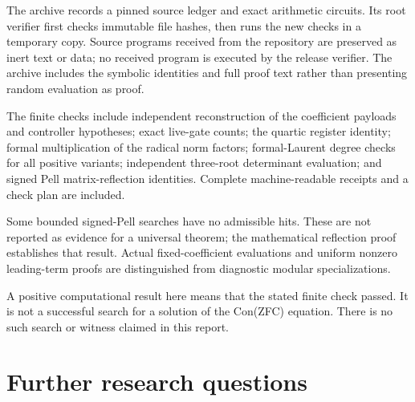 \documentclass[
  10pt,
]{article}
\begin{document}
The archive records a pinned source ledger and exact arithmetic
circuits. Its root verifier first checks immutable file hashes, then
runs the new checks in a temporary copy. Source programs received from
the repository are preserved as inert text or data; no received program
is executed by the release verifier. The archive includes the symbolic
identities and full proof text rather than presenting random evaluation
as proof.

The finite checks include independent reconstruction of the coefficient
payloads and controller hypotheses; exact live-gate counts; the quartic
register identity; formal multiplication of the radical norm factors;
formal-Laurent degree checks for all positive variants; independent
three-root determinant evaluation; and signed Pell matrix-reflection
identities. Complete machine-readable receipts and a check plan are
included.

Some bounded signed-Pell searches have no admissible hits. These are not
reported as evidence for a universal theorem; the mathematical
reflection proof establishes that result. Actual fixed-coefficient
evaluations and uniform nonzero leading-term proofs are distinguished
from diagnostic modular specializations.

A positive computational result here means that the stated finite check
passed. It is not a successful search for a solution of the Con(ZFC)
equation. There is no such search or witness claimed in this report.

\section{Further research questions}\label{further-research-questions}
\end{document}
